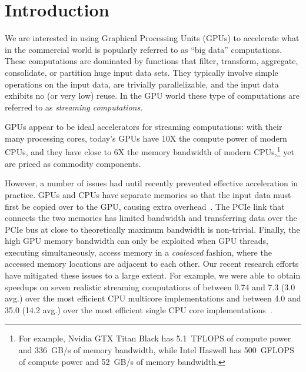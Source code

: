 \section{Introduction}
We are interested in using Graphical Processing Units (GPUs) to accelerate what in the commercial world is popularly
referred to as ``big data'' computations.
These computations are dominated by functions that filter, transform, aggregate, consolidate, or
partition huge input data sets.
They typically involve simple operations on the input data, are trivially parallelizable, and the
input data exhibits no (or very low) reuse.
In the GPU world these type of computations are referred to as \emph{streaming computations}.

GPUs appear to be ideal accelerators for streaming computations: with their many
processing cores, today's GPUs have 10X the compute power of modern CPUs, and they have close to 6X
the memory bandwidth of modern CPUs,\footnote{
	For example, Nvidia GTX Titan Black has 5.1~TFLOPS of compute power and 336~GB/s of memory
	bandwidth, while Intel Haswell has 500~GFLOPS of compute power and 52~GB/s of
	memory bandwidth.}
 yet are priced as commodity components.

However, a number of issues had until recently prevented effective acceleration in practice.
GPUs and CPUs have separate memories so that the input data must first be copied over to the GPU,
causing extra overhead~\cite{gregg2011data}.
The PCIe link that connects the two memories has limited bandwidth and transferring data over
the PCIe bus at close to theoretically maximum bandwidth is non-trivial. 
Finally, the high GPU memory bandwidth can only be exploited when GPU threads, executing simultaneously,
access memory in a \emph{coalesced} fashion, where the accessed memory
locations are adjacent to each other.
Our recent research efforts have mitigated these issues to a large extent.
For example, we were able to obtain speedups on seven realistic streaming computations of between 0.74 and
7.3 (3.0 avg.) over the most efficient CPU multicore implementations and between 4.0 and 35.0 (14.2 avg.) over the most
efficient single CPU core implementations~\cite{mokhtari2014bigkernel}.

